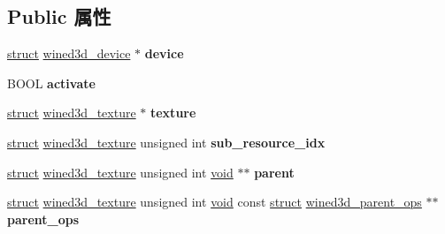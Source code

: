 \subsection*{Public 属性}
\begin{DoxyCompactItemize}
\item 
\mbox{\label{structwined3d__device__parent__ops_a38aaf83fd8de95da07bc75830a467ad9}} 
\hyperlink{interfacestruct}{struct} \hyperlink{structwined3d__device}{wined3d\+\_\+device} $\ast$ {\bfseries device}
\item 
\mbox{\label{structwined3d__device__parent__ops_a502d6e64a6554481cd1f7f5615aadb65}} 
B\+O\+OL {\bfseries activate}
\item 
\mbox{\label{structwined3d__device__parent__ops_a91439bcee337af2390cbabc3a5c9b049}} 
\hyperlink{interfacestruct}{struct} \hyperlink{structwined3d__texture}{wined3d\+\_\+texture} $\ast$ {\bfseries texture}
\item 
\mbox{\label{structwined3d__device__parent__ops_ad44f7f35cfbec686764d268ad71c56e3}} 
\hyperlink{interfacestruct}{struct} \hyperlink{structwined3d__texture}{wined3d\+\_\+texture} unsigned int {\bfseries sub\+\_\+resource\+\_\+idx}
\item 
\mbox{\label{structwined3d__device__parent__ops_a4d618449661f309a6de4c057292e0d9d}} 
\hyperlink{interfacestruct}{struct} \hyperlink{structwined3d__texture}{wined3d\+\_\+texture} unsigned int \hyperlink{interfacevoid}{void} $\ast$$\ast$ {\bfseries parent}
\item 
\mbox{\label{structwined3d__device__parent__ops_ab3c731fbf5bd856c642d9d4466f53530}} 
\hyperlink{interfacestruct}{struct} \hyperlink{structwined3d__texture}{wined3d\+\_\+texture} unsigned int \hyperlink{interfacevoid}{void} const \hyperlink{interfacestruct}{struct} \hyperlink{structwined3d__parent__ops}{wined3d\+\_\+parent\+\_\+ops} $\ast$$\ast$ {\bfseries parent\+\_\+ops}
\item 
\mbox{\label{structwined3d__device__parent__ops_a8e997d6c6ed5dfd9e7fab2aee416eb29}} 

\end{DoxyCompactItemize}
